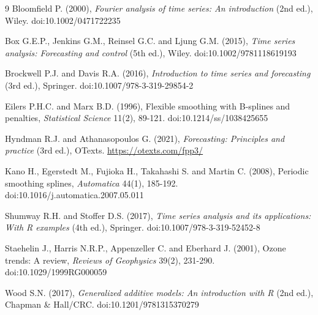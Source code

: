 \documentclass[12pt,a4paper]{article}
\begin{document}
\begin{thebibliography}{9}
Bloomfield P. (2000), {\it Fourier analysis of time series: An introduction} (2nd ed.), Wiley. doi:10.1002/0471722235

Box G.E.P., Jenkins G.M., Reinsel G.C. and Ljung G.M. (2015), {\it Time series analysis: Forecasting and control} (5th ed.), Wiley. doi:10.1002/9781118619193

Brockwell P.J. and Davis R.A. (2016), {\it Introduction to time series and forecasting} (3rd ed.), Springer. doi:10.1007/978-3-319-29854-2

Eilers P.H.C. and Marx B.D. (1996), Flexible smoothing with B-splines and penalties, {\it Statistical Science} 11(2), 89-121. doi:10.1214/ss/1038425655

Hyndman R.J. and Athanasopoulos G. (2021), {\it Forecasting: Principles and practice} (3rd ed.), OTexts. \url{https://otexts.com/fpp3/}

Kano H., Egerstedt M., Fujioka H., Takahashi S. and Martin C. (2008), Periodic smoothing splines, {\it Automatica} 44(1), 185-192. doi:10.1016/j.automatica.2007.05.011

Shumway R.H. and Stoffer D.S. (2017), {\it Time series analysis and its applications: With R examples} (4th ed.), Springer. doi:10.1007/978-3-319-52452-8

Staehelin J., Harris N.R.P., Appenzeller C. and Eberhard J. (2001), Ozone trends: A review, {\it Reviews of Geophysics} 39(2), 231-290. doi:10.1029/1999RG000059

Wood S.N. (2017), {\it Generalized additive models: An introduction with R} (2nd ed.), Chapman \& Hall/CRC. doi:10.1201/9781315370279
\end{thebibliography}
\end{document}
